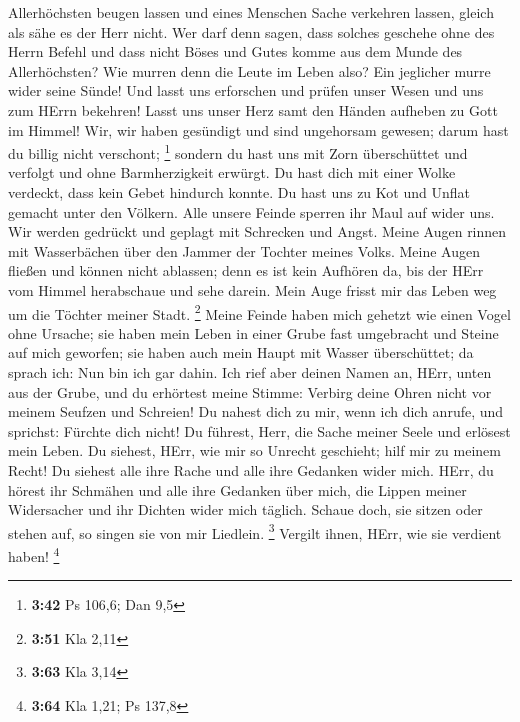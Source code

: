 Allerhöchsten beugen lassen  und eines Menschen Sache
verkehren lassen, gleich als sähe es der Herr nicht.  Wer
darf denn sagen, dass solches geschehe ohne des Herrn Befehl
 und dass nicht Böses und Gutes komme aus dem Munde des
Allerhöchsten?  Wie murren denn die Leute im Leben also?
Ein jeglicher murre wider seine Sünde!  Und lasst uns
erforschen und prüfen unser Wesen und uns zum HErrn bekehren!
 Lasst uns unser Herz samt den Händen aufheben zu Gott im
Himmel!  Wir, wir haben gesündigt und sind ungehorsam
gewesen; darum hast du billig nicht verschont; \footnote{\textbf{3:42}
  Ps 106,6; Dan 9,5}  sondern du hast uns mit Zorn
überschüttet und verfolgt und ohne Barmherzigkeit erwürgt. 
Du hast dich mit einer Wolke verdeckt, dass kein Gebet hindurch konnte.
 Du hast uns zu Kot und Unflat gemacht unter den Völkern.
 Alle unsere Feinde sperren ihr Maul auf wider uns.
 Wir werden gedrückt und geplagt mit Schrecken und Angst.
 Meine Augen rinnen mit Wasserbächen über den Jammer der
Tochter meines Volks.  Meine Augen fließen und können nicht
ablassen; denn es ist kein Aufhören da,  bis der HErr vom
Himmel herabschaue und sehe darein.  Mein Auge frisst mir
das Leben weg um die Töchter meiner Stadt. \footnote{\textbf{3:51} Kla
  2,11}  Meine Feinde haben mich gehetzt wie einen Vogel
ohne Ursache;  sie haben mein Leben in einer Grube fast
umgebracht und Steine auf mich geworfen;  sie haben auch
mein Haupt mit Wasser überschüttet; da sprach ich: Nun bin ich gar
dahin.  Ich rief aber deinen Namen an, HErr, unten aus der
Grube,  und du erhörtest meine Stimme: Verbirg deine Ohren
nicht vor meinem Seufzen und Schreien!  Du nahest dich zu
mir, wenn ich dich anrufe, und sprichst: Fürchte dich nicht!
 Du führest, Herr, die Sache meiner Seele und erlösest mein
Leben.  Du siehest, HErr, wie mir so Unrecht geschieht;
hilf mir zu meinem Recht!  Du siehest alle ihre Rache und
alle ihre Gedanken wider mich.  HErr, du hörest ihr
Schmähen und alle ihre Gedanken über mich,  die Lippen
meiner Widersacher und ihr Dichten wider mich täglich. 
Schaue doch, sie sitzen oder stehen auf, so singen sie von mir Liedlein.
\footnote{\textbf{3:63} Kla 3,14}  Vergilt ihnen, HErr, wie
sie verdient haben! \footnote{\textbf{3:64} Kla 1,21; Ps 137,8}
